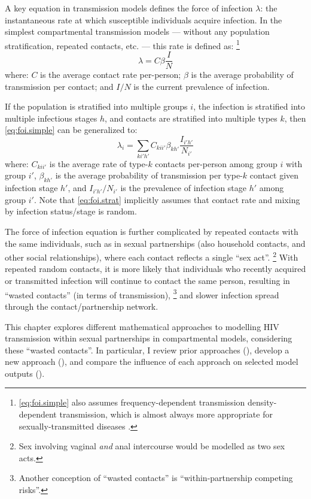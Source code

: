 A key equation in transmission models defines the force of infection $\lambda$:
the instantaneous rate at which susceptible individuals acquire infection.
In the simplest compartmental transmission models
--- \ie without any population stratification, repeated contacts, etc. ---
this rate is defined as:%
\footnote{\eqref{eq:foi.simple} also assumes
  frequency-dependent transmission \vs density-dependent transmission,
  which is almost always more appropriate for sexually-transmitted diseases \cite{Begon2002}.}
\begin{equation}\label{eq:foi.simple}
  \lambda = C \beta \frac{I}{N}
\end{equation}
where:
$C$ is the average contact rate per-person;
$\beta$ is the average probability of transmission per contact; and
$I/N$ is the current prevalence of infection.
\par
If the population is stratified into multiple groups $i$,
the infection is stratified into multiple infectious stages $h$,
and contacts are stratified into multiple types $k$,
then \eqref{eq:foi.simple} can be generalized to:
\begin{equation}\label{eq:foi.strat}
  \lambda_i = \sum_{ki'h'} C_{kii'} \beta_{kh'} \frac{I_{i'h'}}{N_{i'}}
\end{equation}
where:
$C_{kii'}$ is the average rate of type-$k$ contacts per-person among group $i$ with group $i'$,
$\beta_{kh'}$ is the average probability of transmission per type-$k$ contact given infection stage $h'$,
and $I_{i'h'}/N_{i'}$ is the prevalence of infection stage $h'$ among group $i'$.
Note that \eqref{eq:foi.strat} implicitly assumes that
contact rate and mixing by infection status/stage is random.
\par
The force of infection equation is further complicated by
repeated contacts with the same individuals, such as in sexual partnerships
(also household contacts, and other social relationships),
where each contact reflects a single ``sex act''.%
\footnote{Sex involving vaginal \emph{and} anal intercourse would be modelled as two sex acts.}
With repeated \vs random contacts, it is more likely that
individuals who recently acquired or transmitted infection will continue to contact the same person,
resulting in ``wasted contacts'' (in terms of transmission),%
\footnote{Another conception of ``wasted contacts'' is ``within-partnership competing risks''.}
and slower infection spread through the contact/partnership network.
\par
This chapter explores different mathematical approaches to
modelling HIV transmission within sexual partnerships in compartmental models,
considering these ``wasted contacts''.
In particular, I review prior approaches (),
develop a new approach (),
and compare the influence of each approach on selected model outputs ().
